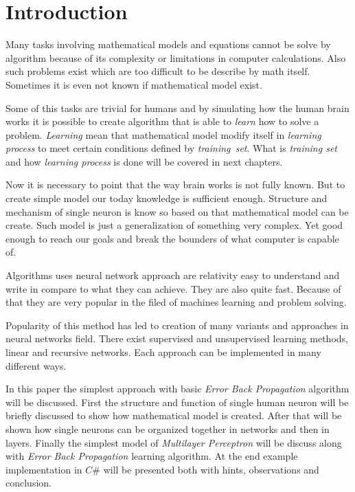 \section{Introduction}
Many tasks involving mathematical models and equations cannot be solve by algorithm because of its complexity or limitations in computer calculations. Also such problems exist which are too difficult to be describe by math itself. Sometimes it is even not known if mathematical model exist.

Some of this tasks are trivial for humans and by simulating how the human brain works it is possible to create algorithm that is able to \textit{learn} how to solve a problem. \textit{Learning} mean that mathematical model modify itself in \textit{learning process} to meet certain conditions defined by \textit{training~set}. What is \textit{training set} and how \textit{learning process} is done will be covered in next chapters.

Now it is necessary to point that the way brain works is not fully known. But to create simple model our today knowledge is sufficient enough. Structure and mechanism of single neuron is know so based on that mathematical model can be create. Such model is just a generalization of something very complex. Yet good enough to reach our goals and break the bounders of what computer is capable of.

Algorithms uses neural network approach are relativity easy to understand and write in compare to what they can achieve. They are also quite fast. Because of that they are very popular in the filed of machines learning and problem solving.

Popularity of this method has led to creation of many variants and approaches in neural networks field. There exist supervised and unsupervised learning methods, linear and recursive networks. Each approach can be implemented in many different ways.

In this paper the simplest approach with basic \textit{Error Back Propagation} algorithm will be discussed. First the structure and function of single human neuron will be briefly discussed to show how mathematical model is created. After that will be shown how single neurons can be organized together in networks and then in layers. Finally the simplest model of \textit{Multilayer Perceptron} will be discuss along with \textit{Error Back Propagation} learning algorithm. At the end example implementation in $ C\# $ will be presented both with hints, observations and conclusion.